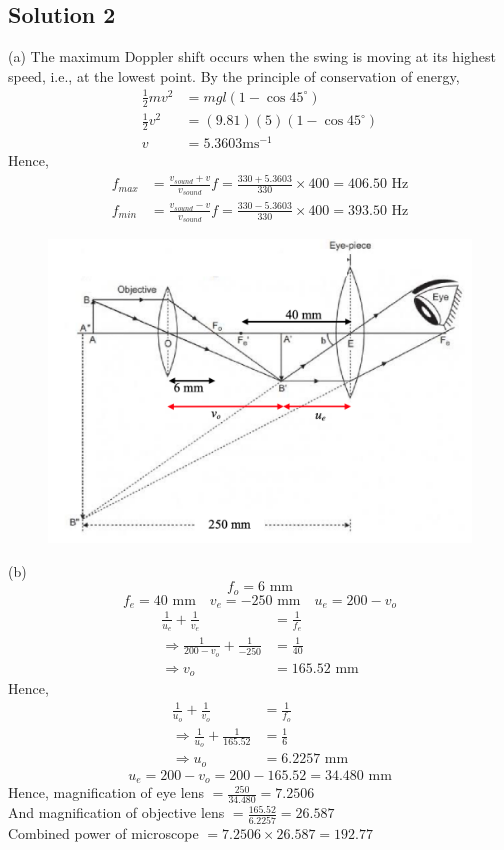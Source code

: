 \documentclass{article}
\begin{document}
\subsection{Solution 2}
(a) The maximum Doppler shift occurs when the swing is moving at its highest speed, i.e., at the lowest point. By the principle of conservation of energy,
\begin{align}
	\frac{1}{2} mv^2 &= mgl \left(1-\cos 45^\circ \right)\\
	\frac{1}{2} v^2 &= (9.81)(5) \left(1-\cos 45^\circ \right)\\
	v &= 5.3603 \text{ms}^{-1}
\end{align}
Hence,
\begin{align}
	f_{max} & = \frac{v_{sound}+v}{v_{sound}} f = \frac{330+5.3603}{330} \times 400 = 406.50 \text{ Hz} \\
	f_{min} & = \frac{v_{sound}-v}{v_{sound}} f = \frac{330-5.3603}{330} \times 400 = 393.50 \text{ Hz}
\end{align}
\begin{figure}
	\centering
	\includegraphics[width=\linewidth]{spho_book_TYS_images/2020q2.png}
\end{figure}
(b) 
\[f_o = 6 \text{ mm}\]
\[f_e = 40 \text{ mm} \quad v_e = -250 \text{ mm} \quad u_e = 200 - v_o \]
\begin{align}
	\frac{1}{u_e} + \frac{1}{v_e} &= \frac{1}{f_e} \\
	\Rightarrow	\frac{1}{200-v_o} + \frac{1}{-250} &= \frac{1}{40} \\
	\Rightarrow v_o &= 165.52 \text{ mm}
\end{align}
Hence,
\begin{align}
	\frac{1}{u_o} + \frac{1}{v_o} &= \frac{1}{f_o} \\
	\Rightarrow	\frac{1}{u_o} + \frac{1}{165.52} &= \frac{1}{6} \\
	\Rightarrow u_o &= 6.2257 \text{ mm}
\end{align}
\[u_e = 200-v_o = 200-165.52 = 34.480 \text{ mm}\]
Hence, magnification of eye lens $= \frac{250}{34.480} = 7.2506$ \\
And magnification of objective lens $ = \frac{165.52}{6.2257} = 26.587$ \\
Combined power of microscope $= 7.2506 \times 26.587 = 192.77 $
\end{document}
